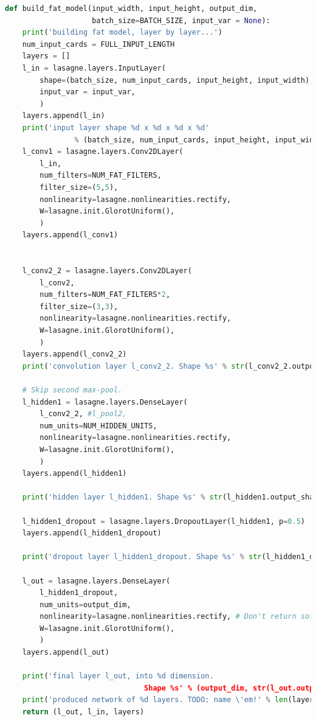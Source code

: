 \documentclass[review]{elsarticle}
\begin{document}
\begin{lstlisting}[language=Python, caption=Big Filter Encoding]
def build_fat_model(input_width, input_height, output_dim,
                    batch_size=BATCH_SIZE, input_var = None):
    print('building fat model, layer by layer...')
    num_input_cards = FULL_INPUT_LENGTH
    layers = []
    l_in = lasagne.layers.InputLayer(
        shape=(batch_size, num_input_cards, input_height, input_width),
        input_var = input_var,
        )
    layers.append(l_in)
    print('input layer shape %d x %d x %d x %d' 
                % (batch_size, num_input_cards, input_height, input_width))
    l_conv1 = lasagne.layers.Conv2DLayer(
        l_in,
        num_filters=NUM_FAT_FILTERS,
        filter_size=(5,5),
        nonlinearity=lasagne.nonlinearities.rectify,
        W=lasagne.init.GlorotUniform(),
        )
    layers.append(l_conv1)

   
    l_conv2_2 = lasagne.layers.Conv2DLayer(
        l_conv2,
        num_filters=NUM_FAT_FILTERS*2,
        filter_size=(3,3),
        nonlinearity=lasagne.nonlinearities.rectify,
        W=lasagne.init.GlorotUniform(),
        )
    layers.append(l_conv2_2)
    print('convolution layer l_conv2_2. Shape %s' % str(l_conv2_2.output_shape))

    # Skip second max-pool.
    l_hidden1 = lasagne.layers.DenseLayer(
        l_conv2_2, #l_pool2,
        num_units=NUM_HIDDEN_UNITS,
        nonlinearity=lasagne.nonlinearities.rectify,
        W=lasagne.init.GlorotUniform(),
        )
    layers.append(l_hidden1)

    print('hidden layer l_hidden1. Shape %s' % str(l_hidden1.output_shape))

    l_hidden1_dropout = lasagne.layers.DropoutLayer(l_hidden1, p=0.5)
    layers.append(l_hidden1_dropout)

    print('dropout layer l_hidden1_dropout. Shape %s' % str(l_hidden1_dropout.output_shape))

    l_out = lasagne.layers.DenseLayer(
        l_hidden1_dropout,
        num_units=output_dim,
        nonlinearity=lasagne.nonlinearities.rectify, # Don't return softmax! #nonlinearity=lasagne.nonlinearities.softmax,
        W=lasagne.init.GlorotUniform(),
        )
    layers.append(l_out)

    print('final layer l_out, into %d dimension. 
                                Shape %s' % (output_dim, str(l_out.output_shape)))
    print('produced network of %d layers. TODO: name \'em!' % len(layers))
    return (l_out, l_in, layers)
\end{lstlisting}
~\cite{moscow25}\\
\end{document}

